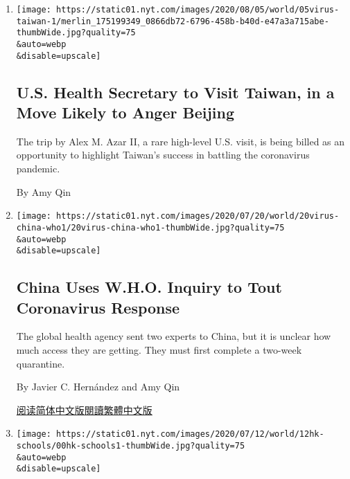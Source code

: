\begin{enumerate}
\def\labelenumi{\arabic{enumi}.}
\item
  \href{/2020/08/04/world/asia/taiwan-azar-beijing-coronavirus.html}{}

  \texttt{[image: https://static01.nyt.com/images/2020/08/05/world/05virus-taiwan-1/merlin\_175199349\_0866db72-6796-458b-b40d-e47a3a715abe-thumbWide.jpg?quality=75\\\&auto=webp\\\&disable=upscale]}

  \hypertarget{us-health-secretary-to-visit-taiwan-in-a-move-likely-to-anger-beijing}{%
  \subsection{U.S. Health Secretary to Visit Taiwan, in a Move Likely to
  Anger
  Beijing}\label{us-health-secretary-to-visit-taiwan-in-a-move-likely-to-anger-beijing}}

  The trip by Alex M. Azar II, a rare high-level U.S. visit, is being
  billed as an opportunity to highlight Taiwan's success in battling the
  coronavirus pandemic.

  By Amy Qin
\item
  \href{/2020/07/21/world/asia/china-coronavirus-who.html}{}

  \texttt{[image: https://static01.nyt.com/images/2020/07/20/world/20virus-china-who1/20virus-china-who1-thumbWide.jpg?quality=75\\\&auto=webp\\\&disable=upscale]}

  \hypertarget{china-uses-who-inquiry-to-tout-coronavirus-response}{%
  \subsection{China Uses W.H.O. Inquiry to Tout Coronavirus
  Response}\label{china-uses-who-inquiry-to-tout-coronavirus-response}}

  The global health agency sent two experts to China, but it is unclear
  how much access they are getting. They must first complete a two-week
  quarantine.

  By Javier C. Hernández and Amy Qin

  \href{https://cn.nytimes.com/china/20200722/china-coronavirus-who/}{阅读简体中文版}\href{https://cn.nytimes.com/china/20200722/china-coronavirus-who/zh-hant/}{閱讀繁體中文版}
\item
  \href{/2020/07/11/world/asia/china-hong-kong-security-schools.html}{}

  \texttt{[image: https://static01.nyt.com/images/2020/07/12/world/12hk-schools/00hk-schools1-thumbWide.jpg?quality=75\\\&auto=webp\\\&disable=upscale]}


\end{enumerate}
